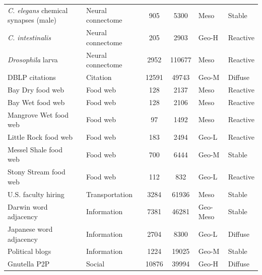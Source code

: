 \documentclass[aps,superscriptaddress,11pt]{revtex4-2}
\theoremstyle{definition}
\theoremstyle{plain}
\begin{document}
\begin{table}[!ht]
\begin{tabular}{llccll}
\textit{C. elegans} chemical synapses (male)~\cite{Cook2019} &
Neural  connectome& 905 & 5300 & Meso & Stable \\

\textit{C. intestinalis} &
Neural connectome & 205 & 2903 & Geo-H & Reactive \\

\textit{Drosophila} larva~\cite{Winding2023} &
Neural connectome & 2952 & 110677 & Meso & Reactive \\

\addlinespace[2pt]
DBLP citations~\cite{nr} &
Citation & 12591 & 49743 & Geo-M & Diffuse \\

\addlinespace[2pt]
Bay Dry food web~\cite{nr} &
Food web & 128 & 2137 & Meso & Reactive \\

Bay Wet food web~\cite{konect,Peixoto2020} &
Food web & 128 & 2106 & Meso & Reactive \\

Mangrove Wet food web~\cite{nr} &
Food web & 97 & 1492 & Meso & Reactive \\

Little Rock food web~\cite{konect,Peixoto2020} &
Food web & 183 & 2494 & Geo-L & Reactive \\

Messel Shale food web~\cite{Dunne2014,Peixoto2020} &
Food web & 700 & 6444 & Geo-M & Stable \\

Stony Stream food web~\cite{Thompson2003,Peixoto2020} &
Food web & 112 & 832 & Geo-L & Reactive \\

\addlinespace[2pt]
U.S. faculty hiring~\cite{Wapman2022,Peixoto2020} &
Transportation & 3284 & 61936 & Meso & Stable \\

\addlinespace[2pt]
Darwin word adjacency~\cite{Milo2004,Peixoto2020} &
Information & 7381 & 46281 & Geo-Meso & Stable \\

Japanese word adjacency~\cite{Milo2004,Peixoto2020} &
Information & 2704 & 8300 & Geo-L & Diffuse \\

Political blogs~\cite{Adamic2005,Peixoto2020} &
Information & 1224 & 19025 & Geo-M & Stable \\

\addlinespace[2pt]
Gnutella P2P~\cite{snapnets} &
Social & 10876 & 39994 & Geo-H & Diffuse \\


\end{tabular}
\end{table}
\end{document}
